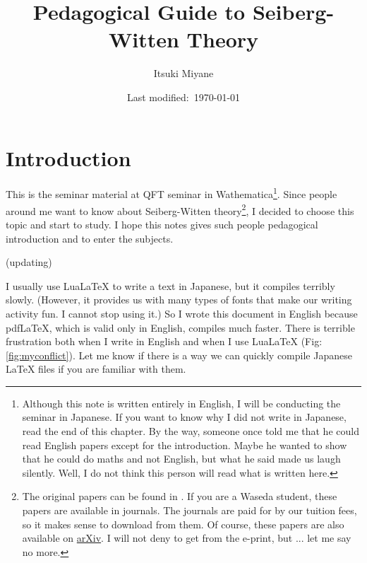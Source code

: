 \documentclass[a4paper,pdftex,10pt]{article}
\begin{document}
\title{
  Pedagogical Guide to Seiberg-Witten Theory
}
\author{
  Itsuki Miyane
}
\date{Last modified:\ \today}

\maketitle

\tableofcontents

\clearpage
\section{Introduction}

This is the seminar material at QFT seminar in Wathematica\footnote{
  Although this note is written entirely in English, I will be conducting the seminar in Japanese. If you want to know why I did not write in Japanese, read the end of this chapter. By the way, someone once told me that he could read English papers except for the introduction. Maybe he wanted to show that he could do maths and not English, but what he said made us laugh silently. Well, I do not think this person will read what is written here.
}. Since people around me want to know about Seiberg-Witten theory\footnote{
  The original papers can be found in \cite{Seiberg:1994rs, Seiberg:1994aj}. If you are a Waseda student, these papers are available in journals. The journals are paid for by our tuition fees, so it makes sense to download from them. Of course, these papers are also available on \href{https://arxiv.org}{arXiv}. I will not deny to get from the e-print, but ... let me say no more.
}, I decided to choose this topic and start to study. I hope this notes gives such people pedagogical introduction and to enter the subjects.

\vspace*{10pt}






(updating)






\vspace*{10pt}

\begin{graybox}
  I usually use Lua{\LaTeX} to write a text in Japanese, but it compiles terribly slowly. (However, it provides us with many types of fonts that make our writing activity fun. I cannot stop using it.) So I wrote this document in English because pdf{\LaTeX}, which is valid only in English, compiles much faster. There is terrible frustration both when I write in English and when I use Lua{\LaTeX} (Fig:\ref{fig:myconflict}). Let me know if there is a way we can quickly compile Japanese {\LaTeX} files if you are familiar with them.
\end{graybox}
\end{document}
